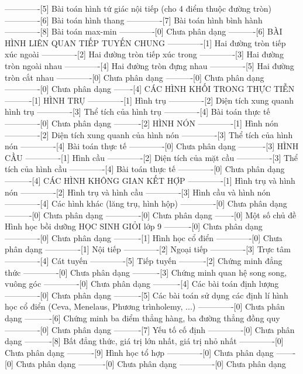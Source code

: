 -------------[5] Bài toán hình tứ giác nội tiếp (cho 4 điểm thuộc đường tròn)
-------------[6] Bài toán hình thang
-------------[7] Bài toán hình bình hành
-------------[8] Bài toán max-min
-------------[0] Chưa phân dạng
----------[6] BÀI HÌNH LIÊN QUAN TIẾP TUYẾN CHUNG
-------------[1] Hai đường tròn tiếp xúc ngoài
-------------[2] Hai đường tròn tiếp xúc trong
-------------[3] Hai đường tròn ngoài nhau
-------------[4] Hai đường tròn đựng nhau
-------------[5] Hai đường tròn cắt nhau
-------------[0] Chưa phân dạng
----------[0] Chưa phân dạng
-------------[0] Chưa phân dạng
-------[4] CÁC HÌNH KHỐI TRONG THỰC TIỄN
----------[1] HÌNH TRỤ
-------------[1] Hình trụ
-------------[2] Diện tích xung quanh hình trụ
-------------[3] Thể tích của hình trụ
-------------[4] Bài toán thực tế
-------------[0] Chưa phân dạng
----------[2] HÌNH NÓN
-------------[1] Hình nón
-------------[2] Diện tích xung quanh của hình nón
-------------[3] Thể tích của hình nón
-------------[4] Bài toán thực tế
-------------[0] Chưa phân dạng
----------[3] HÌNH CẦU
-------------[1] Hình cầu
-------------[2] Diện tích của mặt cầu
-------------[3] Thể tích của hình cầu
-------------[4] Bài toán thực tế
-------------[0] Chưa phân dạng
----------[4] CÁC HÌNH KHÔNG GIAN KẾT HỢP
-------------[1] Hình trụ và hình nón
-------------[2] Hình trụ và hình cầu
-------------[3] Hình cầu và hình nón
-------------[4] Các hình khác (lăng trụ, hình hộp)
-------------[0] Chưa phân dạng
----------[0] Chưa phân dạng
-------------[0] Chưa phân dạng
-------[0] Một số chủ đề Hình học bồi dưỡng HỌC SINH GIỎI lớp 9
----------[0] Chưa phân dạng
-------------[0] Chưa phân dạng
----------[1] Hình học cổ điển
-------------[0] Chưa phân dạng
-------------[1] Nội tiếp
-------------[2] Ngoại tiếp
-------------[3] Trực tâm
-------------[4] Cát tuyến
-------------[5] Tiếp tuyến
----------[2] Chứng minh đẳng thức
-------------[0] Chưa phân dạng
----------[3] Chứng minh quan hệ song song, vuông góc
-------------[0] Chưa phân dạng
----------[4] Các bài toán định lượng
-------------[0] Chưa phân dạng
----------[5] Các bài toán sử dụng các định lí hình học cổ điển (Ceva, Menelaus, Phương trìnholemy, ...)
-------------[0] Chưa phân dạng
----------[6] Chứng minh ba điểm thẳng hàng, ba đường thẳng đồng quy
-------------[0] Chưa phân dạng
----------[7] Yếu tố cố định
-------------[0] Chưa phân dạng
----------[8] Bất đẳng thức, giá trị lớn nhất, giá trị nhỏ nhất
-------------[0] Chưa phân dạng
----------[9] Hình học tổ hợp
-------------[0] Chưa phân dạng
-------[0] Chưa phân dạng
----------[0] Chưa phân dạng
-------------[0] Chưa phân dạng
